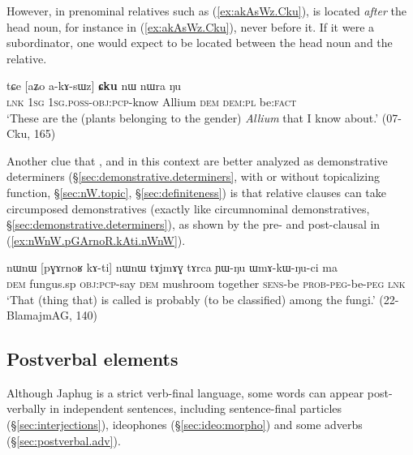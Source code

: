 However, in prenominal relatives such as (\ref{ex:akAsWz.Cku}),  is located \textit{after} the head noun, for instance  in (\ref{ex:akAsWz.Cku}), never before it. If it were a subordinator, one would expect  to be located between the head noun and the relative.

\begin{exe}
\ex \label{ex:akAsWz.Cku}
\gll   tɕe [aʑo a-kɤ-sɯz] \textbf{ɕku} nɯ nɯra ŋu \\
\textsc{lnk} \textsc{1sg} \textsc{1sg}.\textsc{poss}-\textsc{obj}:\textsc{pcp}-know Allium \textsc{dem} \textsc{dem}:\textsc{pl} be:\textsc{fact} \\
\glt `These are the (plants belonging to the gender) \textit{Allium} that I know about.' (07-Cku, 165)
\end{exe}  

Another clue that ,  and  in this context are better analyzed as demonstrative determiners (§\ref{sec:demonstrative.determiners}, with or without topicalizing function, §\ref{sec:nW.topic}, §\ref{sec:definiteness}) is that relative clauses can take circumposed demonstratives (exactly like circumnominal demonstratives, §\ref{sec:demonstrative.determiners}), as shown by the pre- and post-clausal  in (\ref{ex:nWnW.pGArnoR.kAti.nWnW}).

\begin{exe}
\ex \label{ex:nWnW.pGArnoR.kAti.nWnW}
\gll nɯnɯ [pɣɤrnoʁ kɤ-ti] nɯnɯ tɤjmɤɣ tɤrca ɲɯ-ŋu ɯmɤ-kɯ-ŋu-ci ma \\
\textsc{dem} fungus.sp \textsc{obj}:\textsc{pcp}-say \textsc{dem} mushroom together \textsc{sens}-be \textsc{prob}-\textsc{peg}-be-\textsc{peg} \textsc{lnk} \\
\glt `That (thing that) is called  is probably (to be classified) among the fungi.' (22-BlamajmAG, 140)
\end{exe}  

\subsection{Postverbal elements} \label{sec:relative.postverbal}
Although Japhug is a strict verb-final language, some words can appear post-verbally in independent sentences, including sentence-final particles (§\ref{sec:interjections}), ideophones (§\ref{sec:ideo:morpho}) and some adverbs (§\ref{sec:postverbal.adv}).

